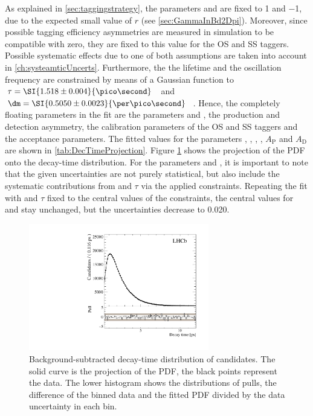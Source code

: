 As explained in \cref{sec:taggingstrategy}, the parameters \Cf and \Cfbar are fixed to \num{1} and \num{-1}, due to the expected small value of $r$ (see \cref{sec:GammaInBd2Dpi}).
Moreover, since possible tagging efficiency asymmetries are measured in simulation to be compatible with zero, they are fixed to this value for the OS and SS taggers.
Possible systematic effects due to one of both assumptions are taken into account in \cref{ch:systeamticUncerts}.
Furthermore, the the \Bz lifetime and the oscillation frequency are constrained by means of a Gaussian function to $\tau=\SI{1.518\pm0.004}{\pico\second}$~\cite{PDG2018} and $\dm=\SI{0.5050\pm0.0023}{\per\pico\second}$~\cite{Aaij:2016fdk}.
Hence, the completely floating parameters in the fit are the \CP parameters \Sf and \Sfbar, the production and detection asymmetry, the calibration parameters of the OS and SS taggers and the acceptance parameters.
The fitted values for the parameters \Sf, \Sfbar, \dm, \DG, $A_{\text{P}}$ and $A_{\text{D}}$ are shown in \cref{tab:DecTimeProjection}.
Figure \ref{fig:DecTimeProjection} shows the projection of the PDF onto the decay-time distribution.
For the \CP parameters \Sf and \Sfbar, it is important to note that the given uncertainties are not purely statistical, but also include the systematic contributions from \dm and $\tau$ via the applied constraints.
Repeating the fit with \dm and $\tau$ fixed to the central values of the constraints, the central values for \Sf and \Sfbar stay unchanged, but the uncertainties decrease to \num{0.020}.
\begin{figure}[tbp]
    \centering
    \includegraphics[width=0.7\textwidth]{10TimeFit/figs/BeautyTime_pull.pdf}
    \caption{Background-subtracted decay-time distribution of \BdToDpi candidates.
    The solid curve is the projection of the PDF, the black points represent the data.
    The lower histogram shows the distributions of pulls, \ie the difference of the binned data and the fitted PDF divided by the data uncertainty in each bin.}
    \label{fig:DecTimeProjection}
\end{figure}

